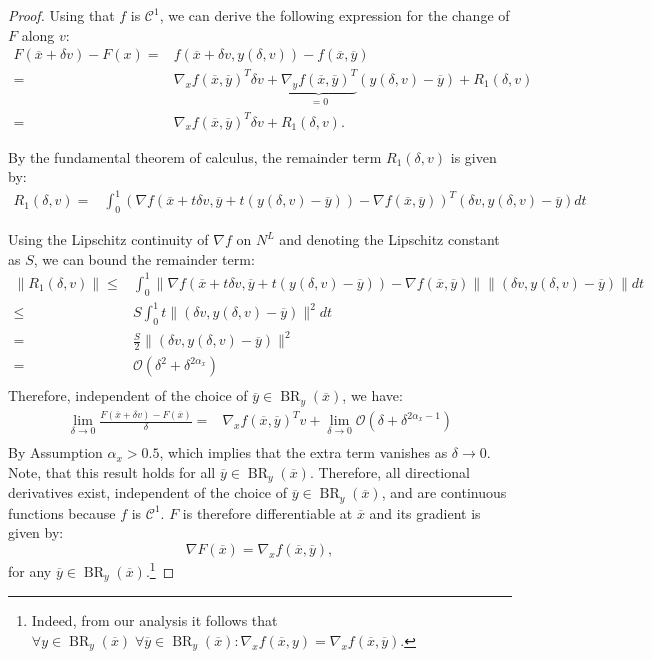 \documentclass[10pt,a4paper]{amsart}
\DeclareMathOperator{\BR}{BR}
\newcommand{\cC}{\mathcal{C}}
\begin{document}
\begin{proof}
    Using that $f$ is $\cC^1$, we can derive the following expression for the change of $F$ along $v$:
    \begin{align*}
        F(\overline{x}+\delta v) - F(x) =& f(\overline{x} +\delta v,y(\delta,v)) - f(\overline{x},\overline{y}) \\
        =& \nabla_x f(\overline{x},\overline{y})^T \delta v + \underbrace{\nabla_y f(\overline{x},\overline{y})^T}_{=0} (y(\delta,v)-\overline{y}) + R_1(\delta,v)\\
        =& \nabla_x f(\overline{x},\overline{y})^T \delta v + R_1(\delta,v).
    \end{align*}

    By the fundamental theorem of calculus, the remainder term $R_1(\delta,v)$ is given by:
    \begin{align*}
        R_1(\delta,v) =& \int_0^1  \left(\nabla f(\overline{x}+t \delta v,\overline{y}+t(y(\delta,v)-\overline{y}))-\nabla f(\overline{x},\overline{y})\right)^T \left( \delta v, y(\delta,v)-\overline{y}\right) dt 
    \end{align*}

    Using the Lipschitz continuity of $\nabla f$ on $N^L$ and denoting the Lipschitz constant as $S$, we can bound the remainder term:
    \begin{align*}
        \|R_1(\delta,v)\| \leq & \int_0^1 \|\nabla f(\overline{x}+t \delta v,\overline{y}+t(y(\delta,v)-\overline{y}))-\nabla f(\overline{x},\overline{y})\|  \| \left( \delta v, y(\delta,v)-\overline{y}\right) \| dt \\
        \leq & S \int_0^1 t \|\left( \delta v, y(\delta,v)-\overline{y}\right) \|^2 dt \\
        = & \frac{S}{2} \|\left( \delta v, y(\delta,v)-\overline{y}\right) \|^2 \\
        = & \mathcal{O}(\delta^2 + \delta^{2\alpha_x} )\\
    \end{align*}
    Therefore, independent of the choice of $\overline{y}\in \BR_y(\overline{x})$, we have:
    \begin{align*}
        \lim_{\delta \to 0} \frac{F(\overline{x}+\delta v)-F(\overline{x})}{\delta} =& \nabla_x f(\overline{x},\overline{y})^T v + \lim_{\delta \to 0} \mathcal{O}(\delta+\delta^{2\alpha_x-1})\\
    \end{align*}    
    By Assumption $\alpha_x>0.5$, which implies that the extra term vanishes as $\delta \to 0$. Note, that this result holds for all $\overline{y}\in \BR_y(\overline{x})$. Therefore, all directional derivatives exist, independent of the choice of $\overline{y}\in \BR_y(\overline{x})$, and are continuous functions because $f$ is $\cC^1$. $F$ is therefore differentiable at $\overline{x}$ and its gradient is given by:
    \[
    \nabla F(\overline{x}) = \nabla_x f(\overline{x},\overline{y}),
    \]
    for any $\overline{y} \in \BR_y(\overline{x})$.\footnote{Indeed, from our analysis it follows that $\forall y \in \BR_y(\overline{x})\; \forall \overline{y} \in \BR_y(\overline{x}):\nabla_x f(\overline{x},y)=\nabla_x f(\overline{x},\overline{y})$.} 


\end{proof}
\end{document}
